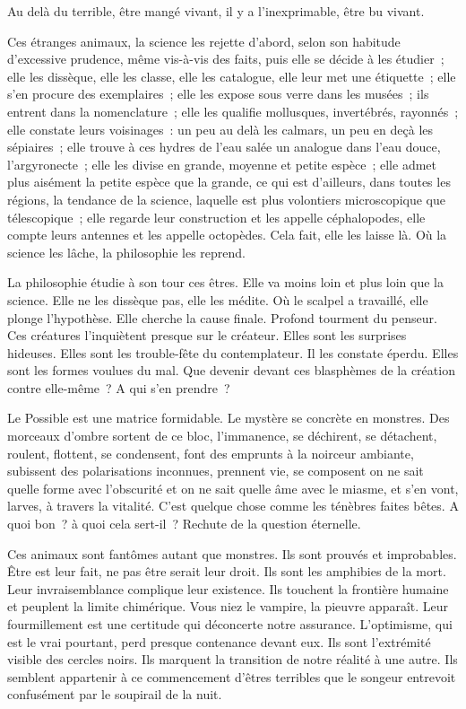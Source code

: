 \documentclass[french,twoside]{book} %
\begin{document}
Au delà du terrible, être mangé vivant, il y a l’inexprimable, être bu vivant.\par
 Ces étranges animaux, la science les rejette d’abord, selon son habitude d’excessive prudence, même vis-à-vis des faits, puis elle se décide à les étudier ; elle les dissèque, elle les classe, elle les catalogue, elle leur met une étiquette ; elle s’en procure des exemplaires ; elle les expose sous verre dans les musées ; ils entrent dans la nomenclature ; elle les qualifie mollusques, invertébrés, rayonnés ; elle constate leurs voisinages : un peu au delà les calmars, un peu en deçà les sépiaires ; elle trouve à ces hydres de l’eau salée un analogue dans l’eau douce, l’argyronecte ; elle les divise en grande, moyenne et petite espèce ; elle admet plus aisément la petite espèce que la grande, ce qui est d’ailleurs, dans toutes les régions, la tendance de la science, laquelle est plus volontiers microscopique que télescopique ; elle regarde leur construction et les appelle céphalopodes, elle compte leurs antennes et les appelle octopèdes. Cela fait, elle les laisse là. Où la science les lâche, la philosophie les reprend.\par
La philosophie étudie à son tour ces êtres. Elle va moins loin et plus loin que la science. Elle ne les dissèque pas, elle les médite. Où le scalpel a travaillé, elle plonge l’hypothèse. Elle cherche la cause finale. Profond tourment du penseur. Ces créatures l’inquiètent presque sur le créateur. Elles sont les surprises hideuses. Elles sont les trouble-fête du contemplateur. Il les constate éperdu. Elles sont les formes voulues du mal. Que devenir devant ces blasphèmes de la création contre elle-même ? A qui s’en prendre ?\par
Le Possible est une matrice formidable. Le mystère  se concrète en monstres. Des morceaux d’ombre sortent de ce bloc, l’immanence, se déchirent, se détachent, roulent, flottent, se condensent, font des emprunts à la noirceur ambiante, subissent des polarisations inconnues, prennent vie, se composent on ne sait quelle forme avec l’obscurité et on ne sait quelle âme avec le miasme, et s’en vont, larves, à travers la vitalité. C’est quelque chose comme les ténèbres faites bêtes. A quoi bon ? à quoi cela sert-il ? Rechute de la question éternelle.\par
Ces animaux sont fantômes autant que monstres. Ils sont prouvés et improbables. Être est leur fait, ne pas être serait leur droit. Ils sont les amphibies de la mort. Leur invraisemblance complique leur existence. Ils touchent la frontière humaine et peuplent la limite chimérique. Vous niez le vampire, la pieuvre apparaît. Leur fourmillement est une certitude qui déconcerte notre assurance. L’optimisme, qui est le vrai pourtant, perd presque contenance devant eux. Ils sont l’extrémité visible des cercles noirs. Ils marquent la transition de notre réalité à une autre. Ils semblent appartenir à ce commencement d’êtres terribles que le songeur entrevoit confusément par le soupirail de la nuit.\par
\end{document}
